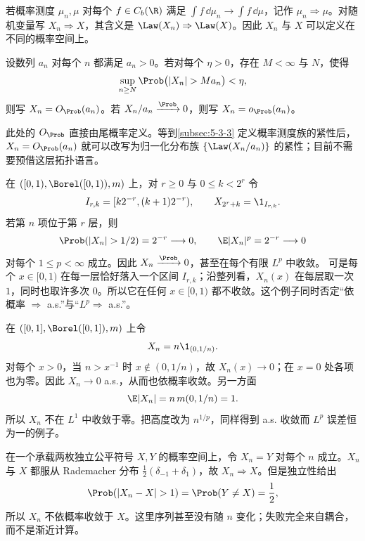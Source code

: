 \begin{definition}[依分布符号]\label{def:5-3-1-2}
若概率测度 $\mu_n,\mu$ 对每个 $f\in C_b(\R)$ 满足
$\int f\,\dd\mu_n\to\int f\,\dd\mu$，记作 $\mu_n\Rightarrow\mu$。对随机变量写
$X_n\Rightarrow X$，其含义是 $\Law(X_n)\Rightarrow\Law(X)$。因此 $X_n$ 与 $X$ 可以定义在不同的概率空间上。
\end{definition}

\begin{definition}[随机阶记号]\label{def:5-3-1-3}
设数列 $a_n$ 对每个 $n$ 都满足 $a_n>0$。若对每个 $\eta>0$，存在 $M<\infty$ 与 $N$，使得
\[
  \sup_{n\ge N}\Prob\bigl(|X_n|>Ma_n\bigr)<\eta,
\]
则写 $X_n=O_\Prob(a_n)$。若 $X_n/a_n\xrightarrow{\Prob}0$，则写
$X_n=o_\Prob(a_n)$。
\end{definition}

此处的 $O_\Prob$ 直接由尾概率定义。等到\cref{subsec:5-3-3} 定义概率测度族的紧性后，
$X_n=O_\Prob(a_n)$ 就可以改写为归一化分布族 $\{\Law(X_n/a_n)\}$ 的紧性；目前不需要预借这层拓扑语言。

\begin{example}[打字机序列]\label{ex:5-3-1-1}
在 $([0,1),\Borel([0,1)),m)$ 上，对 $r\ge0$ 与 $0\le k<2^r$ 令
\[
 I_{r,k}=[k2^{-r},(k+1)2^{-r}),\qquad
 X_{2^r+k}=\1_{I_{r,k}}.
\]
若第 $n$ 项位于第 $r$ 层，则
\[
 \Prob(|X_n|>1/2)=2^{-r}\longrightarrow0,
 \qquad
 \E|X_n|^p=2^{-r}\longrightarrow0
\]
对每个 $1\le p<\infty$ 成立。因此 $X_n\xrightarrow{\Prob}0$，甚至在每个有限 $L^p$ 中收敛。
可是每个 $x\in[0,1)$ 在每一层恰好落入一个区间 $I_{r,k}$；沿整列看，$X_n(x)$ 在每层取一次 $1$，同时也取许多次 $0$。所以它在任何 $x\in[0,1)$ 都不收敛。这个例子同时否定“依概率 $\Rightarrow$ a.s.”与“$L^p\Rightarrow$ a.s.”。
\end{example}

\begin{example}[尖峰破坏矩收敛]\label{ex:5-3-1-2}
在 $([0,1],\Borel([0,1]),m)$ 上令
\[
  X_n=n\1_{(0,1/n)}.
\]
对每个 $x>0$，当 $n>x^{-1}$ 时 $x\notin(0,1/n)$，故 $X_n(x)\to0$；在 $x=0$ 处各项也为零。因此 $X_n\to0$ a.s.，从而也依概率收敛。另一方面
\[
  \E|X_n|=n\,m(0,1/n)=1.
\]
所以 $X_n$ 不在 $L^1$ 中收敛于零。把高度改为 $n^{1/p}$，同样得到 a.s. 收敛而 $L^p$ 误差恒为一的例子。
\end{example}

\begin{example}[同分布不同配对]\label{ex:5-3-1-3}
在一个承载两枚独立公平符号 $X,Y$ 的概率空间上，令 $X_n=Y$ 对每个 $n$ 成立。$X_n$ 与 $X$ 都服从 Rademacher 分布
$\tfrac12(\delta_{-1}+\delta_1)$，故 $X_n\Rightarrow X$。但是独立性给出
\[
 \Prob(|X_n-X|>1)=\Prob(Y\ne X)=\frac12,
\]
所以 $X_n$ 不依概率收敛于 $X$。这里序列甚至没有随 $n$ 变化；失败完全来自耦合，而不是渐近计算。
\end{example}

